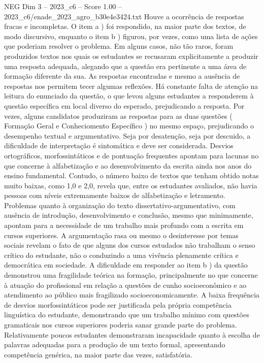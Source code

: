 \begin{textsample}{NEG Dim 3 – 2023\_c6 – Score 1.00 – 2023\_c6/enade\_2023\_agro\_b30e4e3424.txt}
Houve a ocorrência de respostas fracas e incompletas.
O item a ) foi respondido, na maior parte dos textos, de modo discursivo, enquanto o item b ) figurou, por vezes, como uma lista de ações que poderiam resolver o problema.
Em alguns casos, não tão raros, foram produzidos textos nos quais os estudantes se recusaram explicitamente a produzir uma resposta adequada, alegando que a questão era pertinente a uma área de formação diferente da sua.
As respostas encontradas e mesmo a ausência de respostas nos permitem tecer algumas reflexões.
Há constante falta de atenção na leitura do enunciado da questão, o que levou alguns estudantes a responderem à questão específica em local diverso do esperado, prejudicando a resposta.
Por vezes, alguns candidatos produziram as respostas para as duas questões ( Formação Geral e Conheciomento Específico ) no mesmo espaço, prejudicando o desempenho textual e argumentativo.
Seja por desatenção, seja por descuido, a dificuldade de interpretação é sintomática e deve ser considerada.
Desvios ortográficos, morfossintáticos e de pontuação frequentes apontam para lacunas no que concerne à alfabetização e ao desenvolvimento da escrita ainda nos anos do ensino fundamental.
Contudo, o número baixo de textos que tenham obtido notas muito baixas, como 1,0 e 2,0, revela que, entre os estudantes avaliados, não havia pessoas com níveis extremamente baixos de alfabetização e letramento.
Problemas quanto à organização do texto dissertativo-argumentativo, com ausência de introdução, desenvolvimento e conclusão, mesmo que minimamente, apontam para a necessidade de um trabalho mais profundo com a escrita em cursos superiores.
A argumentação rasa ou mesmo o desinteresse por temas sociais revelam o fato de que alguns dos cursos estudados não trabalham o senso crítico do estudante, não o conduzindo a uma vivência plenamente crítica e democrática em sociedade.
A dificuldade em responder ao item b ) da questão demonstrou uma fragilidade teórica na formação, principalmente no que concerne à atuação do profissional em relação a questões de cunho socioeconômico e ao atendimento ao público mais fragilizado socioeconomicamente.
A baixa frequência de desvios morfossintáticos pode ser justificada pela própria competência linguística do estudante, demonstrando que um trabalho mínimo com questões gramaticais nos cursos superiores poderia sanar grande parte do problema.
Relativamente poucos estudantes demonstraram incapacidade quanto à escolha de palavras adequadas para a produção de um texto formal, apresentando competência genérica, na maior parte das vezes, satisfatória.

\end{textsample}
